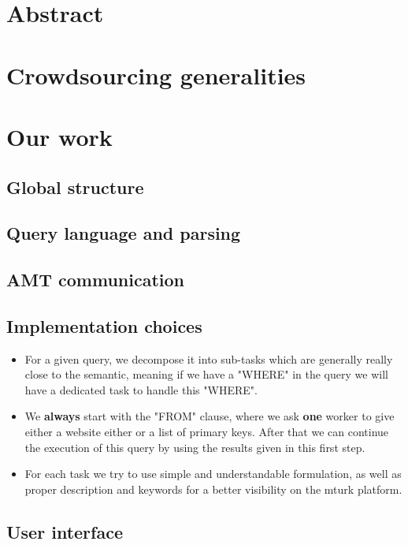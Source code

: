 \documentclass{article}
\begin{document}


\tableofcontents
\newpage

\section{Abstract}

\section{Crowdsourcing generalities}



\section{Our work} %
\subsection{Global structure}
\subsection{Query language and parsing}
\subsection{AMT communication}
\subsection{Implementation choices}
\begin{itemize}
\item For a given query, we decompose it into sub-tasks which are generally really close to the semantic, meaning if we have a "WHERE" in the query we will have a dedicated task to handle this "WHERE".
\item We \textbf{always} start with the "FROM" clause, where we ask \textbf{one} worker to give either a website either or a list of primary keys. After that we can continue the execution of this query by using the results given in this first step.
\item For each task we try to use simple and understandable formulation, as well as proper description and keywords for a better visibility on the mturk platform.

\end{itemize}

\subsection{User interface}
\end{document}
